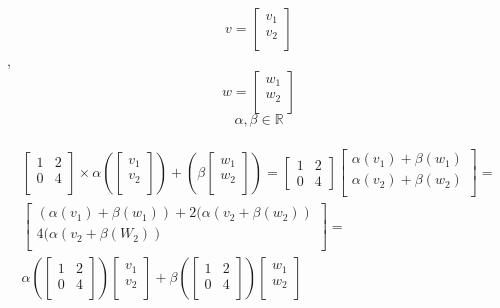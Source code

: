  \[
 v = \begin{bmatrix}
       v_{1}\\
       v_{2}\\
      \end{bmatrix}
 \] 
 ,
 \[ w = \begin{bmatrix}
       w_{1}\\
       w_{2}\\
      \end{bmatrix}
 \]
 \[ \alpha, \beta \in \mathbb{R}\]
 \\
 \begin{align*}
 \begin{bmatrix}
    1   &   2 \\
    0   &   4 \\
\end{bmatrix}
\times \alpha \left(\begin{bmatrix}
       v_{1}\\
       v_{2}\\
      \end{bmatrix} \right)
    + \left(\beta \begin{bmatrix}
       w_{1}\\
       w_{2}\\
      \end{bmatrix}\right) = 
\begin{bmatrix}
    1   &   2 \\
    0   &   4 
\end{bmatrix}
\begin{bmatrix}
    \alpha(v_{1}) + \beta(w_{1}) \\
     \alpha(v_{2}) + \beta(w_{2}) \\
\end{bmatrix}
= \\
\begin{bmatrix}
    (\alpha(v_{1}) + \beta(w_{1})) + 2(\alpha(v_{2} + \beta(w_{2})) \\
    4(\alpha(v_{2} + \beta(W_{2})) \\
\end{bmatrix}
= \\
\alpha \left( 
\begin{bmatrix}
     1   &   2 \\
    0   &   4 \\
\end{bmatrix}\right)
\begin{bmatrix}
       v_{1}\\
       v_{2}\\
      \end{bmatrix}
+ 
\beta \left(
\begin{bmatrix}
     1   &   2 \\
    0   &   4 \\
\end{bmatrix} \right)
\begin{bmatrix}
       w_{1}\\
       w_{2}\\
      \end{bmatrix}\\
  \end{align*}

